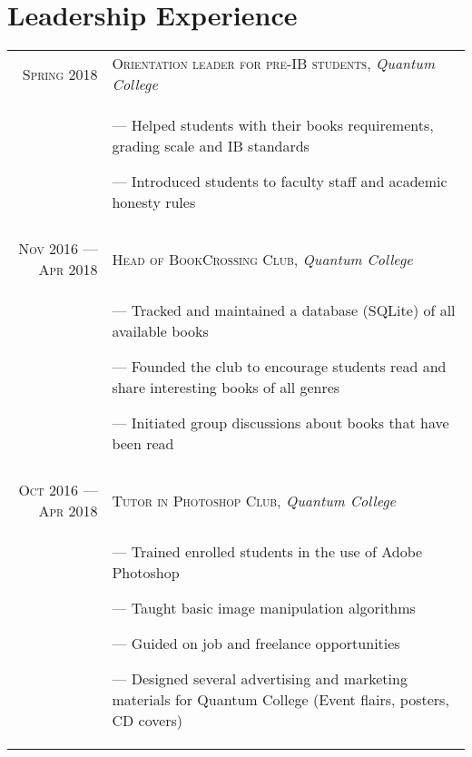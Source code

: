 \documentclass[a4paper,10pt]{article}
\begin{document}
\section{Leadership Experience}
\begin{tabular}{r|p{11cm}}

  \textsc{Spring 2018} &  \textsc{Orientation leader for pre-IB students}, \emph{Quantum College}\\&\footnotesize{
  --- Helped students with their books requirements, grading scale and IB standards

  --- Introduced students to faculty staff and academic honesty rules
  } \\\multicolumn{2}{c}{}\\

  \textsc{Nov 2016 --- Apr 2018} &  \textsc{Head of BookCrossing Club}, \emph{Quantum College}\\&\footnotesize{
  --- Tracked and maintained a database (SQLite) of all available books

  --- Founded the club to encourage students read and share interesting books of all genres

  --- Initiated group discussions about books that have been read
  } \\\multicolumn{2}{c}{}\\

  \textsc{Oct 2016 --- Apr 2018} &  \textsc{Tutor in Photoshop Club}, \emph{Quantum College}\\&\footnotesize{
  --- Trained enrolled students in the use of Adobe Photoshop

  --- Taught basic image manipulation algorithms

  --- Guided on job and freelance opportunities

  --- Designed several advertising and marketing materials for Quantum College (Event flairs, posters, CD covers)
  } \\%
  
\end{tabular}
\end{document}

